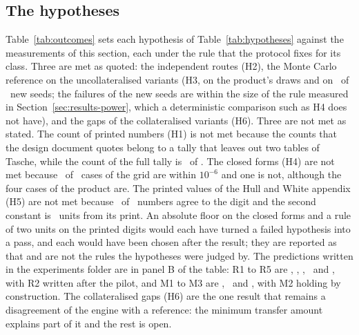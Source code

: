 \subsection{The hypotheses}
\label{sec:results-hypotheses}

Table~\ref{tab:outcomes} sets each hypothesis of Table~\ref{tab:hypotheses} against the measurements of this section, each under the rule that the protocol fixes for its class. Three are met as quoted: the independent routes (H2), the Monte Carlo reference on the uncollateralised variants (H3, on the product's draws and on \nReplNetPass\ of \nReplNetN\ new seeds; the failures of the new seeds are within the size of the rule measured in Section~\ref{sec:results-power}, which a deterministic comparison such as H4 does not have), and the gaps of the collateralised variants (H6). Three are not met as stated. The count of printed numbers (H1) is not met because the counts that the design document quotes belong to a tally that leaves out two tables of Tasche, while the count of the full tally is \nPrintedAgree\ of \nPrintedN. The closed forms (H4) are not met because \nClosedWithin\ of \nClosedCases\ cases of the grid are within $10^{-6}$ and one is not, although the four cases of the product are. The printed values of the Hull and White appendix (H5) are not met because \nWWAgree\ of \nWWN\ numbers agree to the digit and the second constant is \nWWAtwoUnits\ units from its print. An absolute floor on the closed forms and a rule of two units on the printed digits would each have turned a failed hypothesis into a pass, and each would have been chosen after the result; they are reported as that and are not the rules the hypotheses were judged by. The predictions written in the experiments folder are in panel B of the table: R1 to R5 are \nPredRone, \nPredRtwo, \nPredRthree, \nPredRfour\ and \nPredRfive, with R2 written after the pilot, and M1 to M3 are \nPredMone, \nPredMtwo\ and \nPredMthree, with M2 holding by construction. The collateralised gaps (H6) are the one result that remains a disagreement of the engine with a reference: the minimum transfer amount explains part of it and the rest is open.


